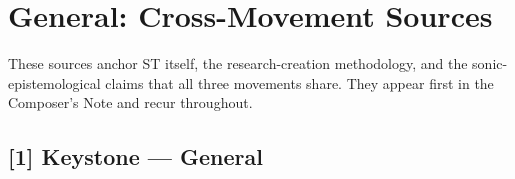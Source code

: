 \bigskip


\section*{General: Cross-Movement Sources}

These sources anchor ST itself, the research-creation methodology, and the sonic-epistemological claims that all three movements share. They appear first in the Composer's Note and recur throughout.

\medskip

\subsection*{[1] Keystone — General}

